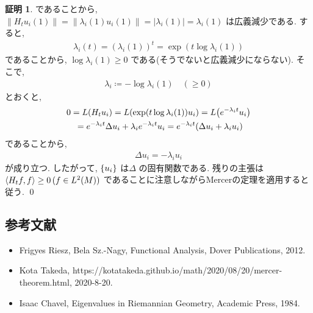 \documentclass[twocolumn, landscape, a4paper , 8pt, fleqn, titlepage ]{jsarticle}
\theoremstyle{definition}
\newtheorem*{pf*}{証明}
\newcommand{\paren}[1]{\mleft( #1\mright )}
\newcommand{\cbra}[1]{\mleft\{#1\mright\}}
\newcommand{\tbra}[1]{\mleft\langle#1\mright\rangle}
\newcommand{\abs}[1]{\left|#1\right|}
\newcommand{\norm}[1]{\left\|#1\right\|}
\renewcommand{\-}{\hyphen}
\begin{document}
\begin{pf*}
であることから, $\norm{H_t u_i (1) } = \norm{\lambda_i (1) u_i(1)} = \abs{\lambda_i (1) } = \lambda_i (1) $ は広義減少である. すると,
\begin{align*} \lambda_i (t) = (\lambda_i (1) )^t = \exp(t \log \lambda_i (1) ) \end{align*}
であることから, $\log \lambda_i (1) \geq 0 $ である(そうでないと広義減少にならない). そこで, 
\begin{align*} \lambda_i \coloneqq - \log \lambda_i (1) \quad  (\geq 0 ) \end{align*}
とおくと, 
\begin{align*} &0 = L(H_t u_i) = L\paren{\exp (t \log \lambda_i (1)) u_i } =  L\paren{e^{-\lambda_i t} u_i } \\&\quad = e^{-\lambda_i t}\Delta u_i + \lambda_i e^{-\lambda_i t} u_i = e^{-\lambda_i t}(\Delta u_i + \lambda_i u_i)  \end{align*}
であることから,
\begin{align*} \Delta u_i = - \lambda_i u_i \end{align*}
が成り立つ. したがって, $\cbra{u_i}$ は$\Delta$ の固有関数である. 残りの主張は$\tbra{H_t f, f} \geq 0 \, (f \in L^2(M))$ であることに注意しながらMercerの定理を適用すると従う.
\qed
\end{pf*}


\subsection{参考文献}

\begin{itemize}
\item Frigyes Riesz, Bela Sz.-Nagy, Functional Analysis, Dover Publications, 2012.
\item Kota Takeda, https://kotatakeda.github.io/math/2020/08/20/mercer-theorem.html, 2020-8-20.
\item Isaac Chavel, Eigenvalues in Riemannian Geometry, Academic Press, 1984.
\end{itemize}
\end{document}
